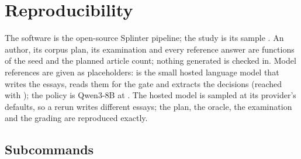 
\section{Reproducibility}\label{sec:reproducibility}

The software is the open-source Splinter pipeline; the study is its sample
. An author, its corpus plan, its examination and every
reference answer are functions of the seed and the planned article count; nothing generated
is checked in. Model references are given as placeholders:  is the small
hosted language model that writes the essays, reads them for the gate and extracts the
decisions (reached with ); the policy is Qwen3-8B at .
The hosted model is sampled at its provider's defaults, so a rerun writes different essays;
the plan, the oracle, the examination and the grading are reproduced exactly.

\subsection{Subcommands}

